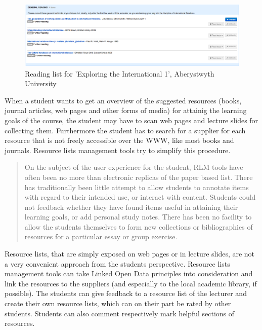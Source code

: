 \documentclass{article}
\begin{document}
\begin{figure}[t]
\centering \includegraphics*[width=1.0\columnwidth]{images/rlm-tools/aber-explore-1.png}
\caption{Reading list for 'Exploring the International 1', Aberystwyth University}
\label{fig:rlm-aber-1}
\end{figure}

When a student wants to get an overview of the suggested resources (books, journal articles, web pages and other forms of media) for attainig the learning goals of the course, the student may have to scan web pages and lecture slides for collecting them. Furthermore the student has to search for a supplier for each resource that is not freely accessible over the WWW, like most books and journals. Resource lists management tools try to simplify this procedure. \begin{quote}On the subject of the user experience for the student, RLM tools have often been no more than electronic replicas of the paper based list. There has traditionally been little attempt to allow students to annotate items with regard to their intended use, or interact with content. Students could not feedback whether they have found items useful in attaining their learning goals, or add personal study notes. There has been no facility to allow the students themselves to form new collections or bibliographies of resources for a particular essay or group exercise.\cite{clarke_resource_2009}\end{quote} Resource lists, that are simply exposed on web pages or in lecture slides, are not a very convenient approach from the students perspective. Resource lists management tools can take Linked Open Data principles into consideration and link the resources to the suppliers (and especially to the local academic library, if possible). The students can give feedback to a resource list of the lecturer and create their own resource lists, which can on their part be rated by other students. Students can also comment respectively mark helpful sections of resources.
\end{document}
